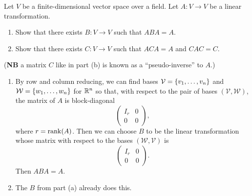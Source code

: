 \begin{question}[subtitle = January 2020 Problem 4,ID=Jan20_4]
Let $V$ be a finite-dimensional vector space over a field. Let $A\colon V \to V$ be a linear transformation.
\begin{enumerate}
    \item Show that there exists $B\colon V \to V$ such that $ABA=A$.
    \item Show that there exists $C\colon V \to V$ such that $ACA=A$ and $CAC=C$.
\end{enumerate}
(\textbf{NB} a matrix $C$ like in part (b) is known as a ``pseudo-inverse'' to $A$.)
\end{question}
\begin{solution}
\begin{enumerate}
    \item By row and column reducing, we can find bases $\mathcal{V} = \{v_1,\dots,v_n\}$ and $\mathcal{W} = \{w_1,\dots,w_n\}$ for $\mathbb{R}^n$ so that, with respect to the pair of bases $(\mathcal{V},\mathcal{W})$, the matrix of $A$ is block-diagonal
    \[\begin{pmatrix} I_r & 0\\0 & 0 \end{pmatrix},\]
    where $r = \operatorname{rank}(A)$. Then we can choose $B$ to be the linear transformation whose matrix with respect to the bases $(\mathcal{W},\mathcal{V})$ is
    \[\begin{pmatrix} I_r & 0\\0 & 0 \end{pmatrix}.\]
    Then $ABA = A$.
    \item The $B$ from part (a) already does this.
\end{enumerate}
\end{solution}

